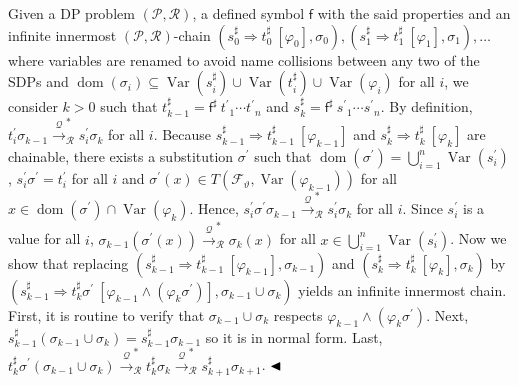 Given a DP problem $(\mathcal{P},\mathcal{R})$, a defined symbol $\mathsf{f}$ with the said properties and an infinite innermost $(\mathcal{P},\mathcal{R})$-chain $({s_{0}^{\sharp}}\Rightarrow{t_{0}^{\sharp}}\ [\varphi_{0}],\sigma_{0}),({s_{1}^{\sharp}}\Rightarrow{t_{1}^{\sharp}}\ [\varphi_{1}],\sigma_{1}),\ldots$ where variables are renamed to avoid name collisions between any two of the SDPs and $\operatorname{dom}(\sigma_{i})\subseteq\operatorname{Var}(s_{i}^{\sharp})\cup\operatorname{Var}(t_{i}^{\sharp})\cup\operatorname{Var}(\varphi_{i})$ for all $i$, we consider $k>0$ such that $t_{k-1}^{\sharp}={\mathsf{f}^{\sharp}}\ {{t^{\prime}}_{1}\cdots{t^{\prime}}_{n}}$ and $s_{k}^{\sharp}={\mathsf{f}^{\sharp}}\ {{s^{\prime}}_{1}\cdots{s^{\prime}}_{n}}$. By definition, $t^{\prime}_{i}\sigma_{k-1}\xrightarrow{\scriptscriptstyle\mathcal{Q}}_{\mathcal{R}}^{*}s^{\prime}_{i}\sigma_{k}$ for all $i$. Because ${s_{k-1}^{\sharp}}\Rightarrow{t_{k-1}^{\sharp}}\ [\varphi_{k-1}]$ and ${s_{k}^{\sharp}}\Rightarrow{t_{k}^{\sharp}}\ [\varphi_{k}]$ are chainable, there exists a substitution $\sigma^{\prime}$ such that $\operatorname{dom}(\sigma^{\prime})=\bigcup_{i=1}^{n}\operatorname{Var}(s^{\prime}_{i})$, $s^{\prime}_{i}\sigma^{\prime}=t^{\prime}_{i}$ for all $i$ and $\sigma^{\prime}(x)\in T({\mathcal{F}}_{\vartheta},\operatorname{Var}(\varphi_{k-1}))$ for all $x\in\operatorname{dom}(\sigma^{\prime})\cap\operatorname{Var}(\varphi_{k})$. Hence, $s^{\prime}_{i}\sigma^{\prime}\sigma_{k-1}\xrightarrow{\scriptscriptstyle\mathcal{Q}}_{\mathcal{R}}^{*}s^{\prime}_{i}\sigma_{k}$ for all $i$. Since $s^{\prime}_{i}$ is a value for all $i$, $\sigma_{k-1}(\sigma^{\prime}(x))\xrightarrow{\scriptscriptstyle\mathcal{Q}}_{\mathcal{R}}^{*}\sigma_{k}(x)$ for all $x\in\bigcup_{i=1}^{n}\operatorname{Var}(s^{\prime}_{i})$. Now we show that replacing $({s_{k-1}^{\sharp}}\Rightarrow{t_{k-1}^{\sharp}}\ [\varphi_{k-1}],\sigma_{k-1})$ and $({s_{k}^{\sharp}}\Rightarrow{t_{k}^{\sharp}}\ [\varphi_{k}],\sigma_{k})$ by $({s_{k-1}^{\sharp}}\Rightarrow{t_{k}^{\sharp}\sigma^{\prime}}\ [\varphi_{k-1}\wedge(\varphi_{k}\sigma^{\prime})],\sigma_{k-1}\cup\sigma_{k})$ yields an infinite innermost chain. First, it is routine to verify that $\sigma_{k-1}\cup\sigma_{k}$ respects $\varphi_{k-1}\wedge(\varphi_{k}\sigma^{\prime})$. Next, $s_{k-1}^{\sharp}(\sigma_{k-1}\cup\sigma_{k})=s_{k-1}^{\sharp}\sigma_{k-1}$ so it is in normal form. Last, $t_{k}^{\sharp}\sigma^{\prime}(\sigma_{k-1}\cup\sigma_{k})\xrightarrow{\scriptscriptstyle\mathcal{Q}}_{\mathcal{R}}^{*}t_{k}^{\sharp}\sigma_{k}\xrightarrow{\scriptscriptstyle\mathcal{Q}}_{\mathcal{R}}^{*}s_{k+1}^{\sharp}\sigma_{k+1}$. $\hfill\blacktriangleleft$\par
 
